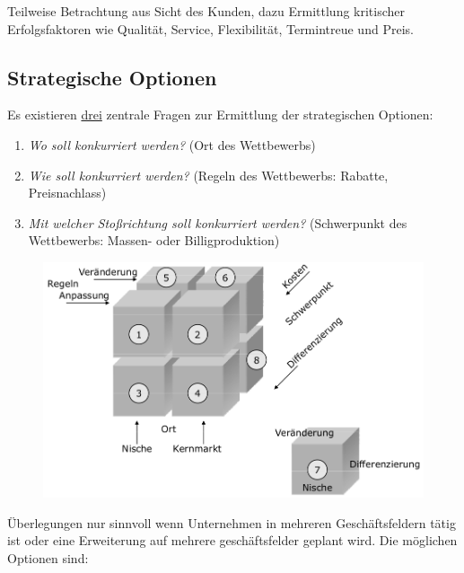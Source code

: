 \documentclass[a4paper,11pt, twoside]{article}
\newcommand\mpar[1]{\marginpar {\flushleft\small #1}}
\begin{document}
Teilweise Betrachtung aus Sicht des Kunden, dazu Ermittlung kritischer Erfolgsfaktoren wie Qualität, Service, Flexibilität, Termintreue und Preis.

\subsection{Strategische Optionen}

\mpar{\textcolor{red}{Nischenmarkt: schwierig, falls besetzt}}
Es existieren \underline{drei} zentrale Fragen zur Ermittlung der strategischen Optionen:
\begin{enumerate}
	\item \textit{Wo soll konkurriert werden?} (Ort des Wettbewerbs)
	\item \textit{Wie soll konkurriert werden?} (Regeln des Wettbewerbs: Rabatte, Preisnachlass)
	\item \textit{Mit welcher Stoßrichtung soll konkurriert werden?} (Schwerpunkt des Wettbewerbs: Massen- oder Billigproduktion)
\end{enumerate}

\begin{figure}[h]
 \begin{center}
   \includegraphics[scale=0.3]{bilder/strategische_optionen.png}
 \end{center}
\end{figure}

Überlegungen nur sinnvoll wenn Unternehmen in mehreren Geschäftsfeldern tätig ist oder eine Erweiterung auf mehrere geschäftsfelder geplant wird. 
Die möglichen Optionen sind:
\end{document}
